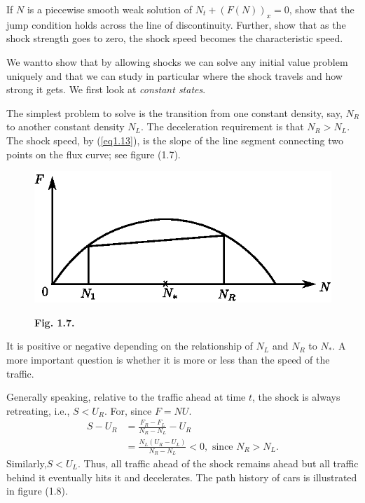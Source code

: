 \begin{exercise}\label{chap1:exer1.3}
If $N$ is a piecewise smooth weak solution of $N_t + (F(N))_x = 0$, show that the jump condition holds across the line of discontinuity. Further, show that as the shock strength goes to zero, the shock speed becomes the characteristic speed.
\end{exercise}

We want\pageoriginale to show that by allowing shocks we can solve any initial value problem uniquely and that we can study in particular where the shock travels and how strong it gets. We first look at {\em constant states}.

The simplest problem to solve is the transition from one constant density, say, $N_R$ to another constant density $N_L$. The deceleration requirement is that $N_R > N_L$. The shock speed, by (\ref{eq1.13}), is the slope of the line segment connecting two points on the flux curve; see figure (1.7).

\begin{figure}[H]
\centering
\includegraphics{figures/fig1.7.eps}
\centerline{\bf Fig. 1.7.}
\end{figure}

It is positive or negative depending on the relationship of $N_L$ and $N_R$ to $N_*$. A more important question is whether it is more or less than the speed of the traffic.

Generally speaking, relative to the traffic ahead at time $t$, the shock is always retreating, i.e., $S < U_R$. For, since $F = NU$.
\begin{align*}
S - U_R & = \frac{F_R - F_L}{N_R - N_L} - U_R\\
& = \frac{N_L(U_R - U_L)}{N_R - N_L} < 0, \text{ since } N_R > N_L. 
\end{align*}
Similarly,\pageoriginale $S < U_L$. Thus, all traffic ahead of the shock remains ahead but all traffic behind it eventually hits it and decelerates. The path history of cars is illustrated in figure (1.8).

